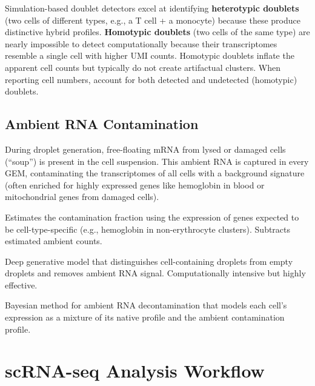 \begin{warningbox}
Simulation-based doublet detectors excel at identifying \textbf{heterotypic
doublets} (two cells of different types, e.g., a T cell + a monocyte) because
these produce distinctive hybrid profiles. \textbf{Homotypic doublets} (two
cells of the same type) are nearly impossible to detect computationally because
their transcriptomes resemble a single cell with higher UMI counts. Homotypic
doublets inflate the apparent cell counts but typically do not create artifactual
clusters. When reporting cell numbers, account for both detected and undetected
(homotypic) doublets.
\end{warningbox}

\subsection{Ambient RNA Contamination}

During droplet generation, free-floating mRNA from lysed or damaged cells
(``soup'') is present in the cell suspension. This ambient RNA is captured in
every GEM, contaminating the transcriptomes of all cells with a background
signature (often enriched for highly expressed genes like hemoglobin in blood
or mitochondrial genes from damaged cells).

\begin{description}[style=nextline]
  \item[\software{SoupX}] Estimates the contamination fraction using the
    expression of genes expected to be cell-type-specific (e.g., hemoglobin in
    non-erythrocyte clusters). Subtracts estimated ambient counts.
  \item[\software{CellBender} (\texttt{remove-background})] Deep
    generative model that distinguishes cell-containing droplets from empty
    droplets and removes ambient RNA signal. Computationally intensive but
    highly effective.
  \item[\software{DecontX}] Bayesian method for ambient RNA decontamination
    that models each cell's expression as a mixture of its native profile and
    the ambient contamination profile.
\end{description}


\section{scRNA-seq Analysis Workflow}
\label{sec:scrnaseq:workflow}

